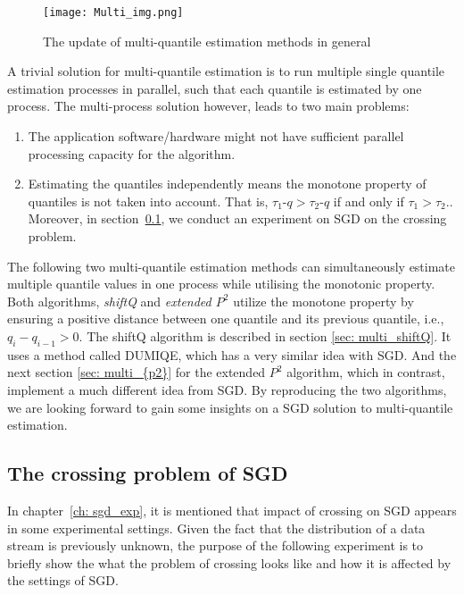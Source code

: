 \begin{figure}[h]
    \centering
	\texttt{[image: Multi\_img.png]}
	\caption{The update of multi-quantile estimation methods in general}
\end{figure}

A trivial solution for multi-quantile estimation is to run multiple single quantile estimation processes in parallel, such that each quantile is estimated by one process. The multi-process solution however, leads to two main problems:
\begin{enumerate}
    \item The application software/hardware might not have sufficient parallel processing capacity for the algorithm.
    \item Estimating the quantiles independently means the monotone property of quantiles is not taken into account. That is, $\tau_1$-$q > \tau_2$-$q$ if and only if $\tau_1 > \tau_2.$. Moreover, in section~\ref{subsec: crossing_SGD}, we conduct an experiment on SGD on the crossing problem.

\end{enumerate}

The following two multi-quantile estimation methods can simultaneously estimate multiple quantile values in one process while utilising the monotonic property. Both algorithms, \textit{shiftQ}\cite{hammerJointTrackingMultiple2019b} and \textit{extended $P^2$}\cite{raatikainenSequentialProcedureSimultaneous1993} utilize the monotone property by ensuring a positive distance between one quantile and its previous quantile, i.e., $q_{i} - q_{i-1} > 0$. 
The shiftQ algorithm is described in section \ref{sec: multi_shiftQ}. It uses a method called DUMIQE, which has a very similar idea with SGD.
And the next section \ref{sec: multi_{p2}} for the extended $P^2$ algorithm, which in contrast, implement a much different idea from SGD. By reproducing the two algorithms, we are looking forward to gain some insights on a SGD solution to multi-quantile estimation.

\subsection{The crossing problem of SGD}
\label{subsec: crossing_SGD}

In chapter~\ref{ch: sgd_exp}, it is mentioned that impact of crossing on SGD appears in some experimental settings. Given the fact that the distribution of a data stream is previously unknown, the purpose of the following experiment is to briefly show the what the problem of crossing looks like and how it is affected by the settings of SGD.

